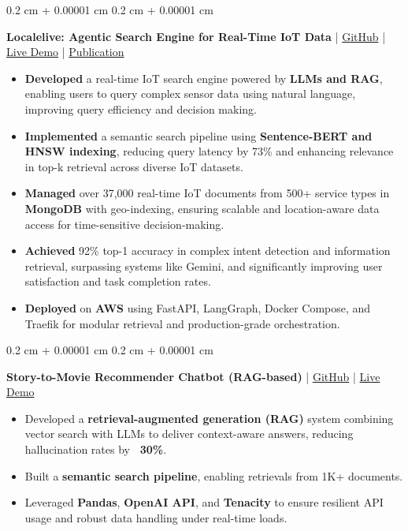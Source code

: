 \documentclass[10pt, letterpaper]{article}
\newenvironment{highlights}{
    \begin{itemize}[
        topsep=0.10 cm,
        parsep=0.10 cm,
        partopsep=0pt,
        itemsep=0pt,
        leftmargin=0.4 cm + 10pt
    ]
}{
    \end{itemize}
} %
\newenvironment{onecolentry}{
    \begin{adjustwidth}{
        0.2 cm + 0.00001 cm
    }{
        0.2 cm + 0.00001 cm
    }
}{
    \end{adjustwidth}
} %
\let\hrefWithoutArrow\href
\renewcommand{\href}[2]{\hrefWithoutArrow{#1}{#2}}
\begin{document}
\begin{onecolentry}
\textbf{Localelive: Agentic Search Engine for Real-Time IoT Data} | \href{https://github.com/SensorsConnect/IoT-Agentic-Search-Engine}{GitHub} | \href{https://localelive.space/}{Live Demo} | \href{https://www.mdpi.com/1424-8220/25/19/5995}{Publication}
\begin{highlights}
    \item \textbf{Developed} a real-time IoT search engine powered by \textbf{LLMs and RAG}, enabling users to query complex sensor data using natural language, improving query efficiency and decision making. %
    
    \item \textbf{Implemented} a semantic search pipeline using \textbf{Sentence-BERT and HNSW indexing}, reducing query latency by 73\% and enhancing relevance in top-k retrieval across diverse IoT datasets.
    
    \item \textbf{Managed} over 37,000 real-time IoT documents from 500+ service types in \textbf{MongoDB} with geo-indexing, ensuring scalable and location-aware data access for time-sensitive decision-making.
    
    \item \textbf{Achieved} 92\% top-1 accuracy in complex intent detection and information retrieval, surpassing systems like Gemini, and significantly improving user satisfaction and task completion rates. %
        
    \item \textbf{Deployed} on \textbf{AWS} using FastAPI, LangGraph, Docker Compose, and Traefik for modular retrieval and production-grade orchestration.

    
\end{highlights}
\end{onecolentry}




\begin{onecolentry}
\textbf{Story-to-Movie Recommender Chatbot (RAG-based)} | \href{https://github.com/elewah/Chatbot-Story-To-Movie}{GitHub} | \href{https://chatbot-story-to-movie.streamlit.app/}{Live Demo}
\begin{highlights}
\item Developed a \textbf{retrieval-augmented generation (RAG)} system combining vector search with LLMs to deliver context-aware answers, reducing hallucination rates by \textbf{~30\%}.
\item Built a \textbf{semantic search pipeline}, enabling retrievals from 1K+ documents.
\item Leveraged \textbf{Pandas}, \textbf{OpenAI API}, and \textbf{Tenacity} to ensure resilient API usage and robust data handling under real-time loads.
\end{highlights}
\end{onecolentry}
\end{document}
